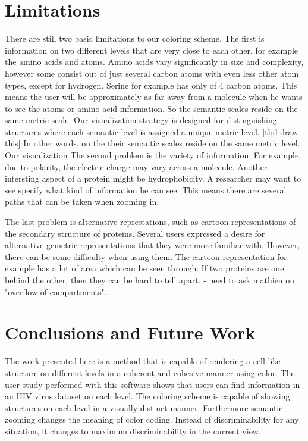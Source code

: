 \documentclass[review,journal]{vgtc}         %
\begin{document}
\section{Limitations}
There are still two basic limitations to our coloring scheme. 
The first is information on two different levels that are very close to each other, for example the amino acids and atoms. 
Amino acids vary significantly in size and complexity, however some consist out of just several carbon atoms with even less other atom types, except for hydrogen. 
Serine for example has only of 4 carbon atoms. This means the user will be approximately as far away from a molecule when he wants to see the atoms or amino acid information. 
So the semantic scales reside on the same metric scale.
Our visualization strategy is designed for distinguishing structures where each semantic level is assigned a unique metric level. [tbd draw this]
In other words, on the their semantic scales reside on the same metric level.
Our visualization 
The second problem is the variety of information. 
For example, due to polarity, the electric charge may vary across a molecule. 
Another intersting aspect of a protein might be hydrophobicity.
A researcher may want to see specify what kind of information he can see. 
This means there are several paths that can be taken when zooming in.

The last problem is alternative represtations, such as cartoon representations of the secondary structure of proteins. 
Several users expressed a desire for alternative gemetric representations that they were more familiar with.
However, there can be some difficulty when using them. The cartoon representation for example has a lot of area which can be seen through. 
If two proteins are one behind the other, then they can be hard to tell apart.
- need to ask mathieu on "overflow of compartments".


\section{Conclusions and Future Work}
The work presented here is a method that is capable of rendering a cell-like structure on different levels in a coherent and cohesive manner using color. 
The user study performed with this software shows that users can find information in an HIV virus dataset on each level. 
The coloring scheme is capable of showing structures on each level in a visually distinct manner. 
Furthermore semantic zooming changes the meaning of color coding. Instead of discriminability for any situation, it changes to maximum discriminability in the current view.
\end{document}
